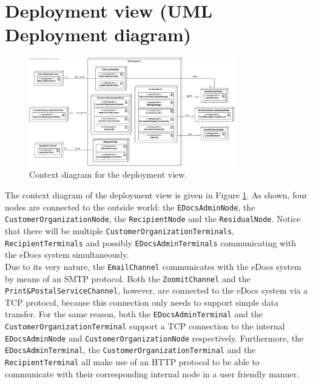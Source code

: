 \documentclass[a4paper,10pt]{article}
\begin{document}
\section{Deployment view (UML Deployment diagram)}\label{sec:deployment}
\begin{figure}[!htp]
	\centering
	\includegraphics[width=0.8\textwidth]{ContextDeployment.png}
	\caption{Context diagram for the deployment view.}
	\label{fig:depl_context}
\end{figure}
\FloatBarrier
\noindent
The context diagram of the deployment view is given in Figure \ref{fig:depl_context}. As shown, four nodes are connected to the outside world: the \texttt{EDocsAdminNode}, the \texttt{CustomerOrganizationNode}, the \texttt{RecipientNode} and the \texttt{ResidualNode}. Notice that there will be multiple \texttt{CustomerOrganizationTerminals}, \texttt{RecipientTerminals} and possibly \texttt{EDocsAdminTerminals} communicating with the eDocs system simultaneously.\\
Due to its very nature, the \texttt{EmailChannel} communicates with the eDocs system by means of an SMTP protocol. Both the \texttt{ZoomitChannel} and the \texttt{Print\&PostalServiceChannel}, however, are connected to the eDocs system via a TCP protocol, because this connection only needs to support simple data transfer. For the same reason, both the \texttt{EDocsAdminTerminal} and the \texttt{CustomerOrganizationTerminal} support a TCP connection to the internal \texttt{EDocsAdminNode} and \texttt{CustomerOrganizationNode} respectively. Furthermore, the \texttt{EDocsAdminTerminal}, the \texttt{CustomerOrganizationTerminal} and the \texttt{RecipientTerminal} all make use of an HTTP protocol to be able to communicate with their corresponding internal node in a user friendly manner.
\end{document}
